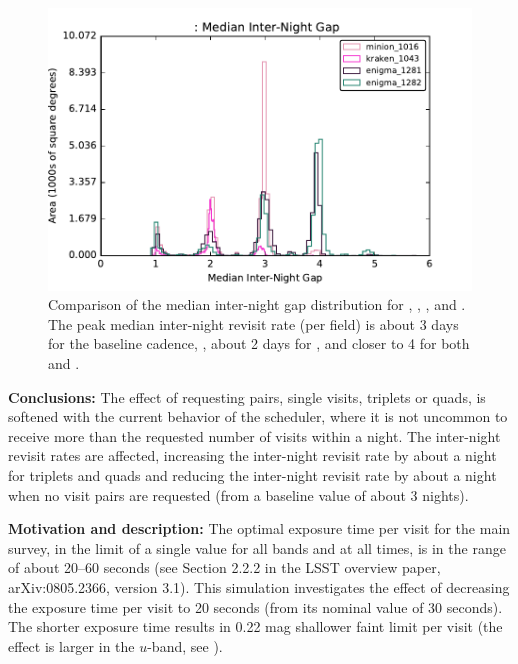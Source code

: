 \begin{figure}[h]
\includegraphics[angle=0,width=0.99\hsize:,clip]{figs/med-internight.pdf}
\caption{
Comparison of the median inter-night gap distribution for
, ,
, and
.
The peak median inter-night revisit rate (per field) is about 3 days for the
baseline cadence, , about 2 days for
, and closer to 4 for both
 and
.}
\label{fig:internightgapCompare}
\end{figure}

{\bf Conclusions:}
The effect of requesting pairs, single visits, triplets or quads, is
softened with the current behavior of the scheduler, where it is not
uncommon to receive more than the requested number of visits within a
night. The inter-night revisit rates are affected, increasing the
inter-night revisit rate by about a night for triplets and quads and
reducing the inter-night revisit rate by about a night when no visit
pairs are requested (from a baseline value of about 3 nights).





{\bf Motivation and description:} The optimal exposure time per visit
for the main survey, in the limit of a single value for all bands and
at all times, is in the range of about 20--60 seconds (see Section
2.2.2 in the LSST overview paper, arXiv:0805.2366, version 3.1). This
simulation investigates the effect of decreasing the exposure time per
visit to 20 seconds (from its nominal value of 30 seconds). The
shorter exposure time results in 0.22 mag shallower faint limit per
visit (the effect is larger in the $u$-band, see
). \\

